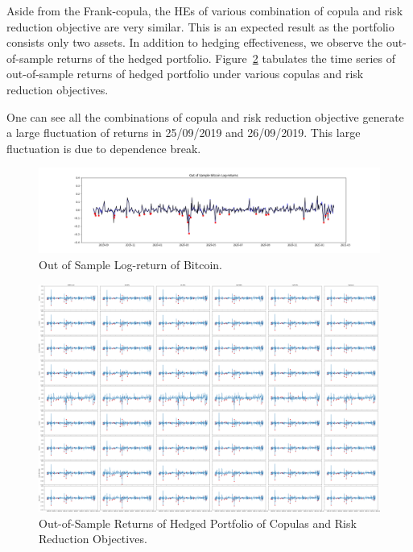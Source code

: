 Aside from the Frank-copula, the HEs of various combination of copula and risk reduction objective are very similar.
This is an expected result as the portfolio consists only two assets.
In addition to hedging effectiveness, we observe the out-of-sample returns of the hedged portfolio.
Figure~\ref{fig:OOSRH} tabulates the time series of out-of-sample returns of hedged portfolio under various copulas and risk reduction objectives.

One can see all the combinations of copula and risk reduction objective generate a large fluctuation of returns in
25/09/2019 and 26/09/2019.
This large fluctuation is due to dependence break.
\medskip

\begin{figure}[th]
   \centering
   \includegraphics[width=\textwidth]{_pics/OOSBitcoin.png}
   \caption{Out of Sample Log-return of Bitcoin.
   }
   \label{fig:Gumbel}
\end{figure}

\newpage
\begin{landscape}
\begin{figure}[th]
   \centering
   \includegraphics[width=\linewidth]{_pics/Rhs.png}
   \caption{Out-of-Sample Returns of Hedged Portfolio of Copulas and Risk Reduction Objectives.
   }
   \label{fig:OOSRH}
\end{figure}
\end{landscape}
\newpage

